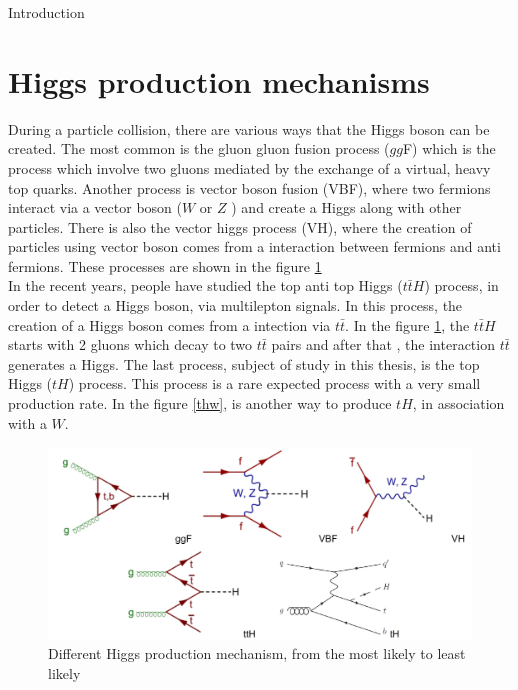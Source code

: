 \begin{chapter}{Introduction}
\pagebreak



\section{Higgs production mechanisms}
During a particle collision, there are various ways that the Higgs boson can be created. The most common is the gluon gluon fusion process ($gg$F) which is the process which involve two gluons  mediated by the exchange of a virtual, heavy top
quarks.  Another process  is vector boson fusion (VBF), where two fermions interact via a vector boson ($W$ or $Z$ ) and create a Higgs along with other particles. There is also the vector higgs process (VH), where the creation of particles using vector boson comes from a interaction between fermions and anti fermions\cite{pd}. These processes are shown in the figure \ref{psu} \\

In the recent years, people have studied the top anti top Higgs  ($t\bar{t}H$) process, in order to detect a Higgs boson, via multilepton signals\cite{th1}.
In this process, the creation of a Higgs boson comes from a intection via $t\bar{t}$. In the figure \ref{psu}, the $t\bar{t}H$ starts with 2 gluons which decay to two $t\bar{t}$ pairs and after that , the interaction $t\bar{t}$  generates a Higgs. The last process, subject of study in this thesis, is the top Higgs ($tH$) process. This process is a rare expected process with a very small production rate\cite{pd}.  In the figure \ref{thw}, is another way to produce $tH$, in association with a $W$.

\begin{figure}[htbp]
\centering
\includegraphics[scale=0.5]{Chapter1/pg.png}
\caption{Different Higgs production mechanism, from the most likely to least likely}
\label{psu}
\end{figure}



\end{chapter}
